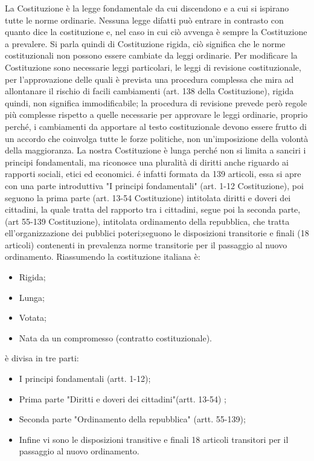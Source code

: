 \documentclass{report}
\begin{document}
La Costituzione è la legge fondamentale da cui discendono e a cui si ispirano tutte le norme ordinarie. Nessuna legge difatti può entrare in contrasto con quanto dice la costituzione e, nel caso in cui ciò avvenga è sempre la Costituzione a prevalere.
Si parla quindi di Costituzione rigida, ciò significa che le norme costituzionali non possono essere cambiate da leggi ordinarie. Per modificare la Costituzione sono necessarie leggi particolari, le leggi di revisione costituzionale, per l'approvazione delle quali è prevista una procedura complessa che mira ad allontanare il rischio di facili cambiamenti (art. 138 della Costituzione),
rigida quindi, non significa immodificabile; la procedura di revisione prevede però regole più complesse rispetto a quelle necessarie per approvare le leggi ordinarie, proprio perché, i cambiamenti da apportare al testo costituzionale devono essere frutto di un accordo che coinvolga tutte le forze politiche, non un'imposizione della volontà della maggioranza. 
La nostra Costituzione è lunga perché non si limita a sanciri i principi fondamentali, ma riconosce una pluralità di diritti anche riguardo ai rapporti sociali, etici ed economici. é infatti formata da 139 articoli, essa si apre con una parte introduttiva "I principi fondamentali" (art. 1-12 Costituzione), poi seguono la prima parte (art. 13-54 Costituzione) intitolata diritti e doveri dei cittadini, la quale tratta del rapporto tra i cittadini, segue poi la seconda parte, (art 55-139 Costituzione), intitolata ordinamento della repubblica, che tratta ell’organizzazione dei pubblici
poteri;seguono le disposizioni transitorie e finali (18 articoli) contenenti in prevalenza norme transitorie per il
passaggio al nuovo ordinamento.
Riassumendo la costituzione italiana è: 
\begin{itemize}
  \item Rigida;
  \item Lunga;
  \item Votata;
  \item Nata da un compromesso (contratto costituzionale).
\end{itemize}

è divisa in tre parti:

\begin{itemize}
  \item I principi fondamentali (artt. 1-12);
  \item Prima parte "Diritti e doveri dei cittadini"(artt. 13-54) ;
  \item Seconda parte "Ordinamento della repubblica" (artt. 55-139);
  \item Infine vi sono le disposizioni transitive e finali 18 articoli transitori per il passaggio al nuovo ordinamento.
\end{itemize}
\end{document}
